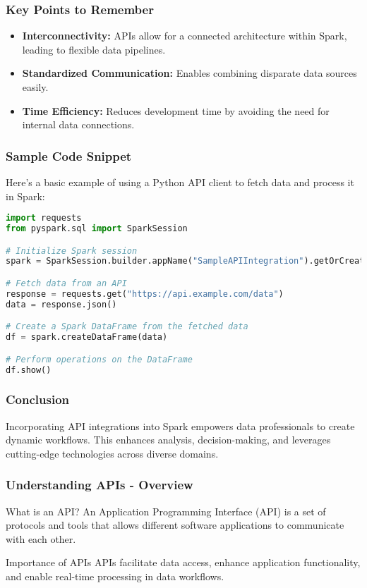 \documentclass[aspectratio=169]{beamer}
\begin{document}
\begin{frame}[fragile]
    \frametitle{Key Points to Remember}
    \begin{itemize}
        \item \textbf{Interconnectivity:} APIs allow for a connected architecture within Spark, leading to flexible data pipelines.
        \item \textbf{Standardized Communication:} Enables combining disparate data sources easily.
        \item \textbf{Time Efficiency:} Reduces development time by avoiding the need for internal data connections.
    \end{itemize}
\end{frame}

\begin{frame}[fragile]
    \frametitle{Sample Code Snippet}
    Here’s a basic example of using a Python API client to fetch data and process it in Spark:
    \begin{lstlisting}[language=Python]
import requests
from pyspark.sql import SparkSession

# Initialize Spark session
spark = SparkSession.builder.appName("SampleAPIIntegration").getOrCreate()

# Fetch data from an API
response = requests.get("https://api.example.com/data")
data = response.json()

# Create a Spark DataFrame from the fetched data
df = spark.createDataFrame(data)

# Perform operations on the DataFrame
df.show()
    \end{lstlisting}
\end{frame}

\begin{frame}[fragile]
    \frametitle{Conclusion}
    Incorporating API integrations into Spark empowers data professionals to create dynamic workflows. 
    This enhances analysis, decision-making, and leverages cutting-edge technologies across diverse domains.
\end{frame}

\begin{frame}[fragile]
    \frametitle{Understanding APIs - Overview}
    \begin{block}{What is an API?}
        An Application Programming Interface (API) is a set of protocols and tools that allows different software applications to communicate with each other. 
    \end{block}
    
    \begin{block}{Importance of APIs}
        APIs facilitate data access, enhance application functionality, and enable real-time processing in data workflows.
    \end{block}
\end{frame}
\end{document}
